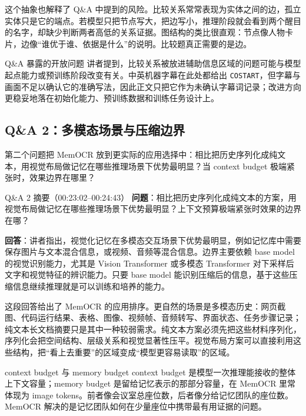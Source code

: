 这个抽象也解释了 Q\&A 中提到的风险。比较关系常常表现为实体之间的边，孤立实体只是它的端点。若模型只把节点写大，把边写小，推理阶段就会看到两个醒目的名字，却缺少判断两者高低的关系证据。图结构的类比很直观：节点像人物卡片，边像“谁优于谁、依据是什么”的说明。比较题真正需要的是边。

\begin{warningbox}{Q\&A 暴露的开放问题}
讲者提到，比较关系被放进辅助信息区域的问题可能与模型起点能力或预训练阶段改变有关。中英机器字幕在此处都给出 \texttt{COSTART}，但字幕与画面不足以确认它的准确写法，因此正文只把它作为未确认字幕词记录；改进方向更稳妥地落在初始化能力、预训练数据和训练任务设计上。
\end{warningbox}

\subsection{Q\&A 2：多模态场景与压缩边界}

第二个问题把 MemOCR 放到更实际的应用选择中：相比把历史序列化成纯文本，用视觉布局做记忆在哪些推理场景下优势最明显？当 context budget 极端紧张时，效果边界在哪里？

\begin{dialoguebox}{Q\&A 2 摘要（00:23:02--00:24:43）}
\textbf{问题}：相比把历史序列化成纯文本的方案，用视觉布局做记忆在哪些推理场景下优势最明显？上下文预算极端紧张时效果的边界在哪？

\textbf{回答}：讲者指出，视觉化记忆在多模态交互场景下优势最明显，例如记忆库中需要保存图片与文本混合信息，或视频、音频等混合信息。边界主要依赖 base model 的视觉识别能力，尤其是 Vision Transformer 或多模态 Transformer 对下采样后文字和视觉特征的辨识能力。只要 base model 能识别压缩后的信息，基于这些压缩信息继续推理就是可以训练和培养的能力。
\end{dialoguebox}

这段回答给出了 MemOCR 的应用排序。更自然的场景是多模态历史：网页截图、代码运行结果、表格、图像、视频帧、音频转写、界面状态、任务步骤记录；纯文本长文档摘要只是其中一种较弱需求。纯文本方案必须先把这些材料序列化，序列化会把空间结构、层级关系和视觉显著性压平。视觉布局方案可以直接利用这些结构，把“看上去重要”的区域变成“模型更容易读取”的区域。

\begin{knowledgebox}{context budget 与 memory budget}
context budget 是模型一次推理能接收的整体上下文容量；memory budget 是留给记忆表示的那部分容量，在 MemOCR 里常体现为 image tokens。前者像会议室总座位数，后者像分给记忆团队的座位数。MemOCR 解决的是记忆团队如何在少量座位中携带最有用证据的问题。
\end{knowledgebox}

